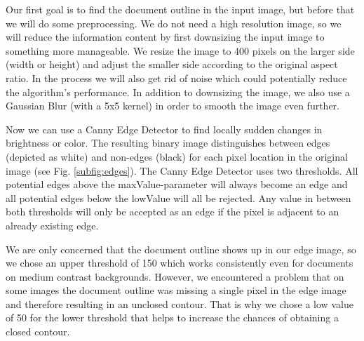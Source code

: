 \documentclass[bibliography=totoc]{scrartcl}
\begin{document}
Our first goal is to find the document outline in the input image, but before that we will do some preprocessing.
We do not need a high resolution image, so we will reduce the information content by first downsizing the input image to something more manageable.
We resize the image to 400 pixels on the larger side (width or height) and adjust the smaller side according to the original aspect ratio.
In the process we will also get rid of noise which could potentially reduce the algorithm's performance.
In addition to downsizing the image, we also use a Gaussian Blur (with a 5x5 kernel) in order to smooth the image even further.

Now we can use a Canny Edge Detector to find locally sudden changes in brightness or color.
The resulting binary image distinguishes between edges (depicted as white) and non-edges (black) for each pixel location in the original image (see Fig. \ref{subfig:edges}).
The Canny Edge Detector uses two thresholds.
All potential edges above the maxValue-parameter will always become an edge and all potential edges below the lowValue will all be rejected.
Any value in between both thresholds will only be accepted as an edge if the pixel is adjacent to an already existing edge. \cite{Canny}

We are only concerned that the document outline shows up in our edge image, so we chose an upper threshold of 150 which works consistently even for documents on medium contrast backgrounds.
However, we encountered a problem that on some images the document outline was missing a single pixel in the edge image and therefore resulting in an unclosed contour.
That is why we chose a low value of 50 for the lower threshold that helps to increase the chances of obtaining a closed contour.\\
\end{document}

